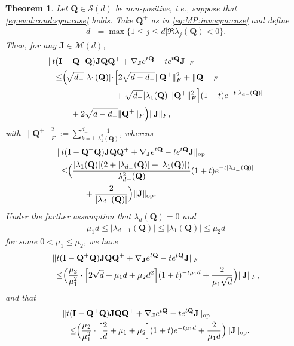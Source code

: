 \documentclass[9pt,twocolumn,twoside]{pnas-new}
\newtheorem{Theorem}{Theorem}
\newcommand{\?}{\textbf{?}}
\newcommand{\op}{\textnormal{op}}
\newcommand{\QQ}{\mathbf{Q}}
\newcommand{\JJ}{\mathbf{J}}
\newcommand{\II}{\mathbf{I}}
\begin{document}
\begin{Theorem}\label{thm:bride:of:frankinstein}
  Let $\QQ \in \mathcal{S}(d)$ be non-positive, i.e.,  suppose that
  \eqref{eq:ev:d:cond:sym:case} holds.  Take $\QQ^+$ as in
  \eqref{eq:MP:inv:sym:case} and define
    \begin{align}\label{eq:first:neg}
      d_{-} = \max\{ 1 \leq j \leq d | \Re \lambda_{j}(\QQ) < 0\}.
    \end{align}
    Then, for any $\JJ \in \mathcal{M}(d)$,
  \begin{align}
      \| t(\II&  -\QQ^+  \QQ) \JJ \QQ \QQ^{+}
                +  \nabla_\JJ e^{t \QQ} - t  e^{t\QQ} \JJ\|_{F} 
                \label{eq:bride:of:frankinstein:1}\\
    \leq&  
    \Big( \! \sqrt{d_{-}}|\lambda_1(\QQ)| \! \cdot\!  \Big[ 2 \sqrt{d-d_{-}} \| \QQ^+\|_F^2 +  \| \QQ^+\|_F
    \notag \\ 
              &\qquad \qquad \qquad \;
    + \sqrt{d_{-}}|\lambda_1(\QQ)|\| \QQ^+\|_F^2 \Big]   (1+t)e^{- t|\lambda_{d-}(\QQ)|}
   \notag \\ 
&\quad+  2\sqrt{d - d_{-}} \| \QQ^+\|_F  \Big)\|\JJ\|_{F},  \notag
  \end{align}
  with $\| \QQ^+\|_F^2 := \sum^{d_-}_{k=1}\frac{1}{\lambda^2_{k}(\QQ)}$, whereas
  \begin{align}
    \| t(&\II -\QQ^+ \QQ) \JJ \QQ \QQ^{+}
         +  \nabla_\JJ e^{t \QQ} - t  e^{t\QQ} \JJ\|_{\op}
         \label{eq:bride:of:frankinstein}\\
    \leq &
           \Big(
           \frac{|\lambda_1(\QQ)|(2 + |\lambda_{d_-}(\QQ)|  + |\lambda_1(\QQ)|)}{\lambda^2_{d-}(\QQ)} 
           (1+t) e^{-t |\lambda_{d_-}(\QQ)|}
           \notag
    \\ 
              &\qquad+ \frac{2}{|\lambda_{d_{-}}(\QQ)|}\Big) \|\JJ\|_{\op}.
                \notag
  \end{align}
  Under the further assumption that $\lambda_{d}(\QQ) = 0$
  and
  \begin{align}
    \mu_1 d \leq |\lambda_{d-1}(\QQ)|
    \leq |\lambda_{1}(\QQ)| \leq \mu_2 d
  \end{align}
  for some $0< \mu_1\leq \mu_2$, we have
    \begin{align}\label{eq:bride:of:frankinstein:1:rm:app}
    \| t(&\II  -\QQ^+ \QQ) \JJ \QQ \QQ^{+}
         +  \nabla_\JJ e^{t \QQ} - t  e^{t\QQ} \JJ\|_{F}
         \\
     \leq &    \Big(\frac{\mu_2}{\mu_1^2}  \cdot \Big[ 2 \sqrt{d} + \mu_1 d  
            +  \mu_2 d^2\Big](1+t)^{-t \mu_1 d} +  \frac{2}{\mu_1 \sqrt{d}} \Big) \|\JJ\|_{F},
            \notag
  \end{align}
  and that
    \begin{align}\label{eq:bride:of:frankinstein:0:rm:app}
    \| t(\II & -\QQ^+ \QQ) \JJ \QQ \QQ^{+}
         +  \nabla_\JJ e^{t \QQ} - t  e^{t\QQ} \JJ\|_{\op}\\
      \leq &  \Big( \frac{\mu_2}{\mu^2_1}\cdot\Big[   \frac{2}{d} + \mu_1  +\mu_2\Big]
             (1+t)e^{-t \mu_1 d} + \frac{2}{\mu_1 d}\Big)
            \|\JJ\|_{\op}.\notag
  \end{align}
\end{Theorem}
\end{document}
